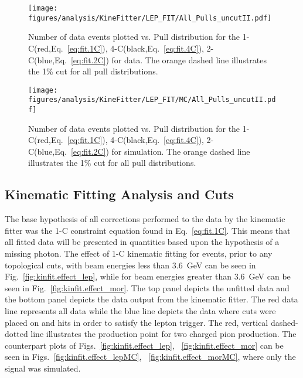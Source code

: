 \begin{figure}[h!]\begin{center}
\texttt{[image: \\figures/analysis/KineFitter/LEP\_FIT/All\_Pulls\_uncutII.pdf]}
\caption[Number of data events plotted vs. Pull distribution for the 1-C(red), 4-C(black), 2-C(blue) for  data]{\label{fig:kinfit.analysispulls}Number of data events plotted vs. Pull distribution for the 1-C(red,Eq.~\ref{eq:fit.1C}), 4-C(black,Eq.~\ref{eq:fit.4C}), 2-C(blue,Eq.~\ref{eq:fit.2C}) for  data. The orange dashed line illustrates the 1\% cut for all pull distributions.}
\end{center}\end{figure}

\begin{figure}[h!]\begin{center}
\texttt{[image: \\figures/analysis/KineFitter/LEP\_FIT/MC/All\_Pulls\_uncutII.pdf]}
\caption[Number of data events plotted vs. Pull distribution for the 1-C(red), 4-C(black), 2-C(blue) for  simulation]{\label{fig:kinfit.analysispulls_MC}Number of data events plotted vs. Pull distribution for the 1-C(red,Eq.~\ref{eq:fit.1C}), 4-C(black,Eq.~\ref{eq:fit.4C}), 2-C(blue,Eq.~\ref{eq:fit.2C}) for  simulation. The orange dashed line illustrates the 1\% cut for all pull distributions.}
\end{center}\end{figure}
\FloatBarrier
%
%
%
\subsection{Kinematic Fitting Analysis and Cuts}\label{sec:analysis.fitting.compare}

The base hypothesis of all corrections performed to the data by the kinematic fitter was the 1-C constraint equation found in Eq.~\ref{eq:fit.1C}. This means that all fitted data will be presented in quantities based upon the hypothesis of a missing photon. The effect of 1-C kinematic fitting for events, prior to any topological cuts, with beam energies less than 3.6~GeV can be seen in Fig.~\ref{fig:kinfit.effect_lep}, while for beam energies greater than 3.6~GeV can be seen in Fig.~\ref{fig:kinfit.effect_mor}. The top panel depicts the unfitted data and the bottom panel depicts the data output from the kinematic fitter. The red data line represents all data while the blue line depicts the data where cuts were placed on  and  hits in order to satisfy the lepton trigger. The red, vertical dashed-dotted line illustrates the production point for two charged pion production. The  counterpart plots of Figs.~\ref{fig:kinfit.effect_lep}, ~\ref{fig:kinfit.effect_mor} can be seen in Figs.~\ref{fig:kinfit.effect_lepMC}, ~\ref{fig:kinfit.effect_morMC}, where only the \piz signal was simulated.

